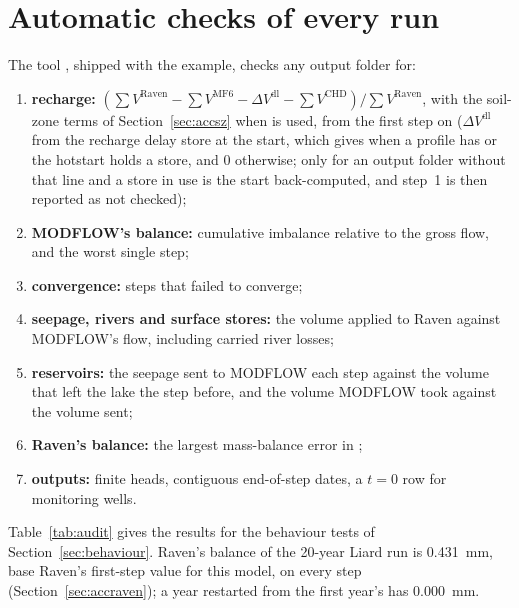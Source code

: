 \section{Automatic checks of every run}\label{sec:audit}
The tool , shipped with the example, checks any output folder for:
\begin{enumerate}
\item \textbf{recharge:} $\left(\sum V^{\mathrm{Raven}}-\sum V^{\mathrm{MF6}}-\Delta V^{\mathrm{dl}}-\sum V^{\mathrm{CHD}}\right)/\sum V^{\mathrm{Raven}}$,
with the soil-zone terms of Section~\ref{sec:accsz} when  is used, from the first step on
($\Delta V^{\mathrm{dl}}$ from the recharge delay store at the start, which  gives when a profile
has  or the hotstart holds a store, and 0 otherwise; only for an output folder without that line
and a store in use is the start back-computed, and step~1 is then reported as not checked);
\item \textbf{MODFLOW's balance:} cumulative imbalance relative to the gross flow, and the worst single step;
\item \textbf{convergence:} steps that failed to converge;
\item \textbf{seepage, rivers and surface stores:} the volume applied to Raven against MODFLOW's flow, including carried river losses;
\item \textbf{reservoirs:} the seepage sent to MODFLOW each step against the volume that left the lake the step before, and
      the volume MODFLOW took against the volume sent;
\item \textbf{Raven's balance:} the largest mass-balance error in ;
\item \textbf{outputs:} finite heads, contiguous end-of-step dates, a $t=0$ row for monitoring wells.
\end{enumerate}
Table~\ref{tab:audit} gives the results for the behaviour tests of Section~\ref{sec:behaviour}. Raven's balance of the
20-year Liard run is 0.431~mm, base Raven's first-step value for this model, on every step (Section~\ref{sec:accraven}); a
year restarted from the first year's  has 0.000~mm.



